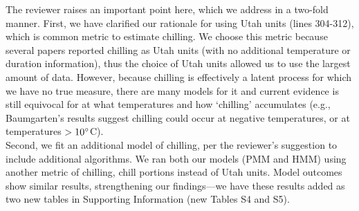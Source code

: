 \documentclass[11pt]{article}
\begin{document}
The reviewer raises an important point here, which we address in a two-fold manner. First, we have clarified our rationale for using Utah units (lines 304-312), which is common metric to estimate chilling. We choose this metric because several papers reported chilling as Utah units (with no additional temperature or duration information), thus the choice of Utah units allowed us to use the largest amount of data. However, because chilling is effectively a latent process for which we have no true measure, there are many models for it and current evidence is still equivocal for at what temperatures and how `chilling' accumulates (e.g., Baumgarten's results suggest chilling could occur at negative temperatures, or at temperatures $>10\degree$C). \\

Second, we fit an additional model of chilling, per the reviewer's suggestion to include additional algorithms. We ran both our models (PMM and HMM) using another metric of chilling, chill portions instead of Utah units. Model outcomes show similar results, strengthening our findings---we have these results added as two new tables in Supporting Information (new Tables S4 and S5).\\  
\end{document}
